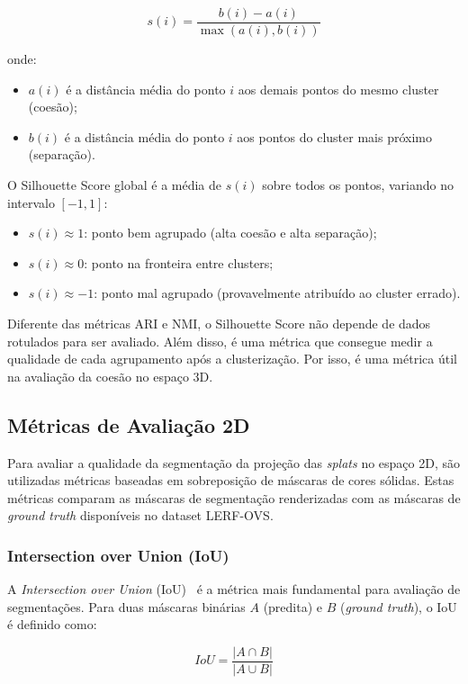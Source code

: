 \[
s(i) = \frac{b(i) - a(i)}{\max(a(i), b(i))}
\]

onde:
\begin{itemize}
    \item $a(i)$ é a distância média do ponto $i$ aos demais pontos do mesmo cluster (coesão);
    \item $b(i)$ é a distância média do ponto $i$ aos pontos do cluster mais próximo (separação).
\end{itemize}

O Silhouette Score global é a média de $s(i)$ sobre todos os pontos, variando no intervalo $[-1, 1]$:
\begin{itemize}
    \item $s(i) \approx 1$: ponto bem agrupado (alta coesão e alta separação);
    \item $s(i) \approx 0$: ponto na fronteira entre clusters;
    \item $s(i) \approx -1$: ponto mal agrupado (provavelmente atribuído ao cluster errado).
\end{itemize}

Diferente das métricas ARI e NMI, o Silhouette Score não depende de dados rotulados para ser avaliado. Além disso, é uma métrica que consegue medir a qualidade de cada agrupamento após a clusterização. Por isso, é uma métrica útil na avaliação da coesão no espaço 3D.


\subsection{Métricas de Avaliação 2D}

Para avaliar a qualidade da segmentação da projeção das \emph{splats} no espaço 2D, são utilizadas métricas baseadas em sobreposição de máscaras de cores sólidas. Estas métricas comparam as máscaras de segmentação renderizadas com as máscaras de \textit{ground truth} disponíveis no dataset LERF-OVS.

\subsubsection{Intersection over Union (IoU)}

A \textit{Intersection over Union} (IoU)~\cite{everingham2010pascal} é a métrica mais fundamental para avaliação de segmentações. Para duas máscaras binárias $A$ (predita) e $B$ (\textit{ground truth}), o IoU é definido como:

\[
IoU = \frac{|A \cap B|}{|A \cup B|}
\]

